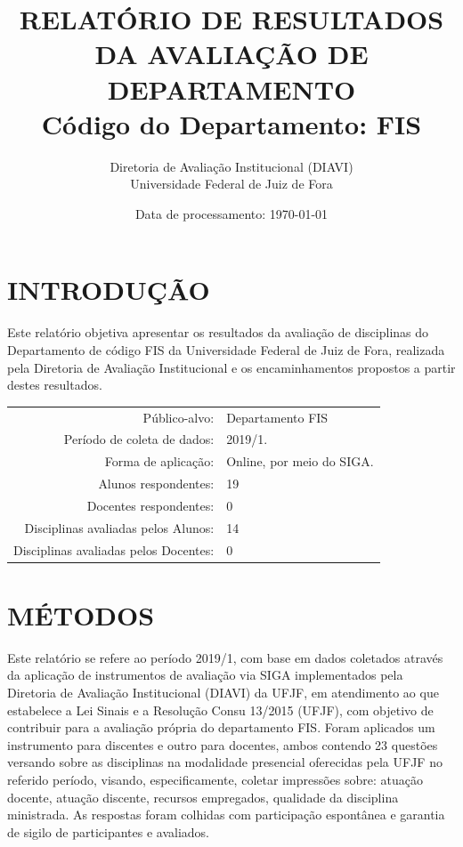 \documentclass[a4paper,10pt]{article}
\date{Data de processamento: \today}
\begin{document}
\author{Diretoria de Avaliação Institucional (DIAVI) \\ Universidade Federal de Juiz de Fora}

\title{RELATÓRIO DE RESULTADOS DA AVALIAÇÃO DE DEPARTAMENTO\\ Código do Departamento: FIS}
\maketitle
\section{INTRODUÇÃO}
Este relatório objetiva apresentar os resultados da avaliação de disciplinas do Departamento     de código FIS da Universidade Federal de Juiz de Fora, realizada pela     Diretoria de Avaliação Institucional e os encaminhamentos propostos a     partir destes resultados.

\begin{center}
\begin{tabularx}{\linewidth}{r|X}

Público-alvo:& Departamento  FIS\\

Período de coleta de dados:& 2019/1.\\

Forma de aplicação:& Online, por meio do SIGA.\\

Alunos   respondentes:& 19\\

Docentes respondentes:& 0\\

Disciplinas avaliadas pelos   Alunos:& 14\\

Disciplinas avaliadas pelos Docentes:& 0\\
\end{tabularx}
\end{center}

\section{MÉTODOS}
Este relatório se refere ao período 2019/1, com base em dados     coletados através da aplicação de instrumentos de avaliação via SIGA     implementados pela Diretoria de Avaliação Institucional (DIAVI) da UFJF, em atendimento     ao que estabelece a Lei Sinais e a Resolução Consu 13/2015 (UFJF),     com objetivo de contribuir para a avaliação própria do departamento FIS.    Foram aplicados um instrumento para discentes e outro para docentes, ambos contendo     23 questões versando sobre as disciplinas na modalidade presencial oferecidas pela UFJF no     referido período, visando, especificamente, coletar impressões sobre: atuação docente, atuação discente,     recursos empregados, qualidade da disciplina ministrada.     As respostas foram colhidas      com participação espontânea e garantia de    sigilo de participantes e avaliados.
\end{document}
